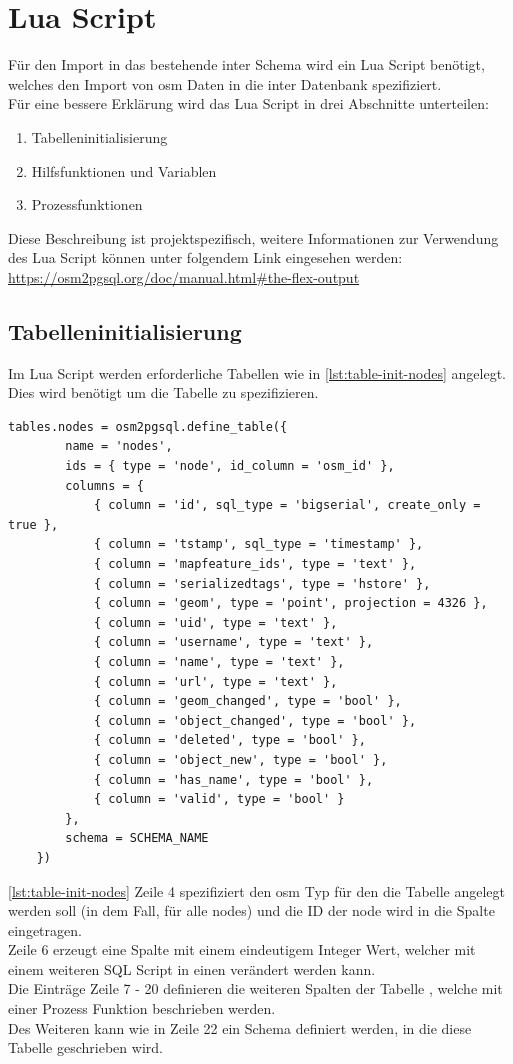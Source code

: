 \newpage
\section{Lua Script}
Für den Import in das bestehende \gls{inter} Schema wird ein Lua Script benötigt, welches den Import von \gls{osm} Daten in die \gls{inter} Datenbank spezifiziert.\\
Für eine bessere Erklärung wird das Lua Script in drei Abschnitte unterteilen:
\begin{enumerate}
	\item Tabelleninitialisierung
	\item Hilfsfunktionen und Variablen
	\item Prozessfunktionen
\end{enumerate}
Diese Beschreibung ist projektspezifisch, weitere Informationen zur Verwendung des Lua Script können unter folgendem Link eingesehen werden: \\
\url{https://osm2pgsql.org/doc/manual.html#the-flex-output}
\subsection{Tabelleninitialisierung}\label{subsec:table-init}
Im Lua Script werden erforderliche Tabellen wie in \autoref{lst:table-init-nodes} angelegt. Dies wird benötigt um die Tabelle zu spezifizieren.
\begin{lstlisting}[language={[5.0]Lua}, caption={Initialisierung eine Tabelle für alle nodes},label={lst:table-init-nodes}]
	tables.nodes = osm2pgsql.define_table({
		name = 'nodes',						
		ids = { type = 'node', id_column = 'osm_id' },
		columns = {
			{ column = 'id', sql_type = 'bigserial', create_only = true },
			{ column = 'tstamp', sql_type = 'timestamp' },
			{ column = 'mapfeature_ids', type = 'text' },
			{ column = 'serializedtags', type = 'hstore' },
			{ column = 'geom', type = 'point', projection = 4326 },
			{ column = 'uid', type = 'text' },
			{ column = 'username', type = 'text' },
			{ column = 'name', type = 'text' },
			{ column = 'url', type = 'text' },
			{ column = 'geom_changed', type = 'bool' },
			{ column = 'object_changed', type = 'bool' },
			{ column = 'deleted', type = 'bool' },
			{ column = 'object_new', type = 'bool' },
			{ column = 'has_name', type = 'bool' },
			{ column = 'valid', type = 'bool' }
		},
		schema = SCHEMA_NAME
	})
\end{lstlisting}
\autoref{lst:table-init-nodes} Zeile 4 spezifiziert den osm Typ für den die Tabelle angelegt werden soll (in dem Fall, für alle nodes) und die ID der node wird in die Spalte  eingetragen.\\
Zeile 6 erzeugt eine Spalte mit einem eindeutigem Integer Wert, welcher mit einem weiteren SQL Script in einen  verändert werden kann.\\
Die Einträge Zeile 7 - 20 definieren die weiteren Spalten der Tabelle , welche mit einer Prozess Funktion beschrieben werden.\\
Des Weiteren kann wie in Zeile 22 ein Schema definiert werden, in die diese Tabelle geschrieben wird.

